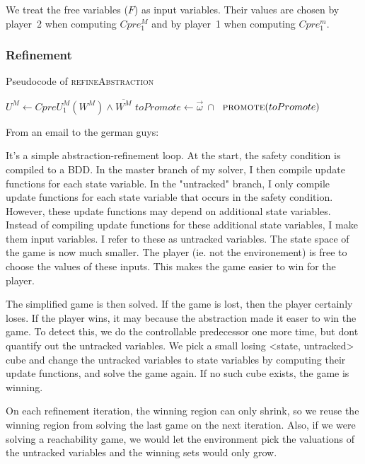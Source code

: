 \documentclass{book}
\theoremstyle{definition}
\begin{document}
We treat the free variables ($F$) as input variables. Their values are chosen by player~2 when computing $Cpre_1^M$ and by player~1 when computing $Cpre_1^m$. 

\subsubsection{Refinement}

\begin{algorithm}

\caption{Pseudocode of \textsc{refineAbstraction}}
\label{alg:refineAbstraction}

\begin{algorithmic}[1]
    \State $U^M \gets CpreU_1^M(W^M) \land \overline{W^M}$
    \State $toPromote \gets \vec{\omega}~\cap~$
    \State $\Call{promote}{toPromote}$
\EndFunction
\end{algorithmic}
\end{algorithm}

From an email to the german guys:

It's a simple abstraction-refinement loop. At the start, the safety condition is compiled to a BDD. In the master branch of my solver, I then compile update functions for each state variable. In the "untracked" branch, I only compile update functions for each state variable that occurs in the safety condition. However, these update functions may depend on additional state variables. Instead of compiling update functions for these additional state variables, I make them input variables. I refer to these as untracked variables. The state space of the game is now much smaller. The player (ie. not the environement) is free to choose the values of these inputs. This makes the game easier to win for the player.

The simplified game is then solved. If the game is lost, then the player certainly loses. If the player wins, it may because the abstraction made it easer to win the game. To detect this, we do the controllable predecessor one more time, but dont quantify out the untracked variables. We pick a small losing <state, untracked> cube and change the untracked variables to state variables by computing their update functions, and solve the game again. If no such cube exists, the game is winning.

On each refinement iteration, the winning region can only shrink, so we reuse the winning region from solving the last game on the next iteration. Also, if we were solving a reachability game, we would let the environment pick the valuations of the untracked variables and the winning sets would only grow.
\end{document}
